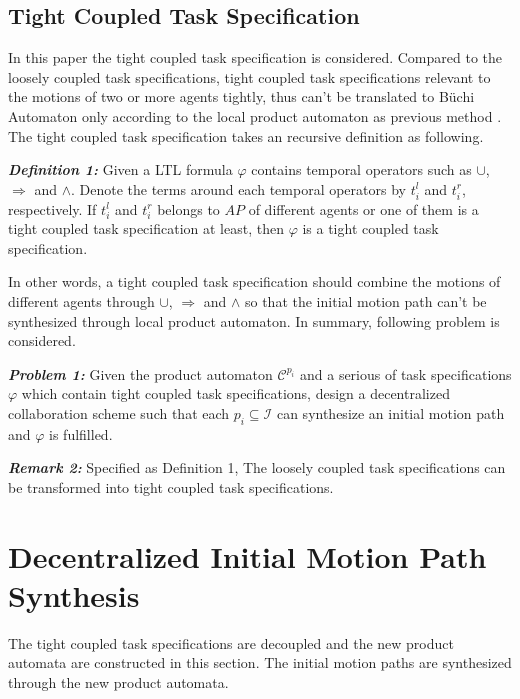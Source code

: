 \documentclass[journal]{IEEEtran}
\begin{document}
\subsection{Tight Coupled Task Specification}
In this paper the tight coupled task specification is considered. Compared to the loosely coupled task specifications, tight coupled task specifications relevant to the motions of two or more agents tightly, thus can't be translated to B\"{u}chi Automaton only according to the local product automaton as previous method \cite{guo2017task}. The tight coupled task specification takes an recursive definition as following.
\par
\textbf{\emph{Definition 1:}} Given a LTL formula $\varphi$ contains temporal operators such as $\cup$, $\Longrightarrow$ and $\wedge$. Denote the terms around each temporal operators by $t^{l}_i$ and $t^{r}_i$, respectively. If $t^{l}_i$ and $t^{r}_i$ belongs to $AP$ of different agents or one of them is a tight coupled task specification at least, then $\varphi$ is a tight coupled task specification.
\par
In other words, a tight coupled task specification should combine the motions of different agents through $\cup$, $\Longrightarrow$ and $\wedge$ so that the initial motion path can't be synthesized through local product automaton. In summary, following problem is considered.
\par
\textbf{\emph{Problem 1:}} Given the product automaton $\mathcal{C}^{p_i}$ and a serious of task specifications $\varphi$ which contain tight coupled task specifications, design a decentralized collaboration scheme such that each $p_i \subseteq \mathcal{I}$ can synthesize an initial motion path and $\varphi$ is fulfilled.

\textbf{\emph{Remark 2:}} Specified as Definition 1, The loosely coupled task specifications can be transformed into tight coupled task specifications.
\section{Decentralized Initial Motion Path Synthesis}
The tight coupled task specifications are decoupled and the new product automata are constructed in this section. The initial motion paths are synthesized through the new product automata.
\end{document}
